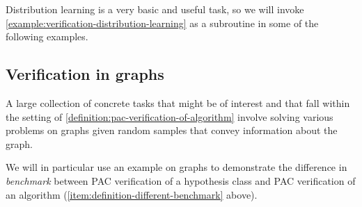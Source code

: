 \documentclass[11pt]{article}
\begin{document}
Distribution learning is a very basic and useful task, so we will invoke \cref{example:verification-distribution-learning} as a subroutine in some of the following examples.

%

%

%
%

%
%

\subsection{Verification in graphs}

A large collection of concrete tasks that might be of interest and that fall within the setting of \cref{definition:pac-verification-of-algorithm} involve solving various problems on graphs given random samples that convey information about the graph.

We will in particular use an example on graphs to demonstrate the difference in \emph{benchmark} between PAC verification of a hypothesis class and PAC verification of an algorithm (\cref{item:definition-different-benchmark} above).
\end{document}
